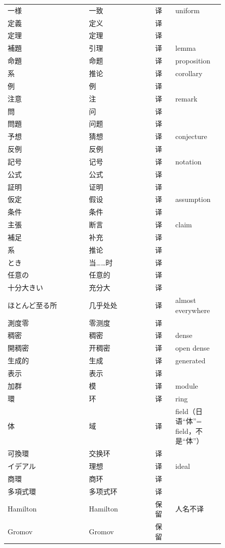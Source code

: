 {\begin{longtable}{p{0.32\linewidth} p{0.26\linewidth} p{0.08\linewidth} p{0.19\linewidth}}
一様 & 一致 & 译 & uniform \\
定義 & 定义 & 译 &  \\
定理 & 定理 & 译 &  \\
補題 & 引理 & 译 & lemma \\
命題 & 命题 & 译 & proposition \\
系 & 推论 & 译 & corollary \\
例 & 例 & 译 &  \\
注意 & 注 & 译 & remark \\
問 & 问 & 译 &  \\
問題 & 问题 & 译 &  \\
予想 & 猜想 & 译 & conjecture \\
反例 & 反例 & 译 &  \\
記号 & 记号 & 译 & notation \\
公式 & 公式 & 译 &  \\
証明 & 证明 & 译 &  \\
仮定 & 假设 & 译 & assumption \\
条件 & 条件 & 译 &  \\
主張 & 断言 & 译 & claim \\
補足 & 补充 & 译 &  \\
系 & 推论 & 译 &  \\
とき & 当……时 & 译 &  \\
任意の & 任意的 & 译 &  \\
十分大きい & 充分大 & 译 &  \\
ほとんど至る所 & 几乎处处 & 译 & almost everywhere \\
測度零 & 零测度 & 译 &  \\
稠密 & 稠密 & 译 & dense \\
開稠密 & 开稠密 & 译 & open dense \\
生成的 & 生成 & 译 & generated \\
表示 & 表示 & 译 &  \\
加群 & 模 & 译 & module \\
環 & 环 & 译 & ring \\
体 & 域 & 译 & field（日语“体”= field，不是“体”） \\
可換環 & 交换环 & 译 &  \\
イデアル & 理想 & 译 & ideal \\
商環 & 商环 & 译 &  \\
多項式環 & 多项式环 & 译 &  \\
Hamilton & Hamilton & 保留 & 人名不译 \\
Gromov & Gromov & 保留 &  \\

\end{longtable}}
